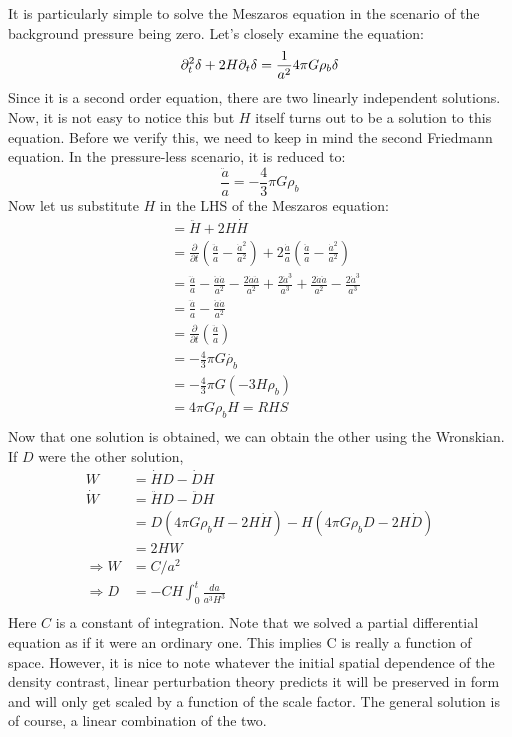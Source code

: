 \documentclass[12pt,a4paper,twoside]{book}
\def\pa{{\partial}}
\begin{document}
				It is particularly simple to solve the Meszaros equation in the scenario of the background pressure being zero. Let's closely examine the equation:
				$$
					\pa_t^2\delta+2H\pa_t\delta=\frac{1}{a^2}4\pi G\rho_b\delta\\
				$$
				Since it is a second order equation, there are two linearly independent solutions. Now, it is not easy to notice this but $H$ itself turns out to be a solution to this equation. Before we verify this, we need to keep in mind the second Friedmann equation. In the pressure-less scenario, it is reduced to:
				$$
					\frac{\ddot{a}}{a}=-\frac{4}{3}\pi G\rho_b
				$$
				Now let us substitute $H$ in the LHS of the Meszaros equation:
				$$
				\begin{aligned}
					&=\ddot{H}+2H\dot{H}\\
					&=\frac{\pa}{\pa t}\left(\frac{\ddot{a}}{a}-\frac{\dot{a}^2}{a^2}\right)+2\frac{\dot{a}}{a}\left(\frac{\ddot{a}}{a}-\frac{\dot{a}^2}{a^2}\right)\\
					&=\frac{\dddot{a}}{a}-\frac{\ddot{a}\dot{a}}{a^2}-\frac{2\dot{a}\ddot{a}}{a^2}+\frac{2\dot{a}^3}{a^3}+\frac{2\dot{a}\ddot{a}}{a^2}-\frac{2\dot{a}^3}{a^3}\\
					&=\frac{\dddot{a}}{a}-\frac{\ddot{a}\dot{a}}{a^2}\\
					&=\frac{\pa }{\pa t}\left(\frac{\ddot{a}}{a}\right)\\
					&=-\frac{4}{3}\pi G\dot{\rho_b}\\
					&=-\frac{4}{3}\pi G(-3H\rho_b)\\
					&=4\pi G \rho_b H=RHS\\
				\end{aligned}
				$$
				Now that one solution is obtained, we can obtain the other using the Wronskian. If $D$ were the other solution,
				\begin{equation}
					\begin{aligned}
						W&=\dot{H}D-\dot{D}H\\
						\dot{W}&=\ddot{H}D-\ddot{D}H\\
						&=D(4\pi G\rho_bH-2H\dot{H})-H(4\pi G\rho_bD-2H\dot{D})\\
						&=2HW\\
						\Rightarrow W&=C/a^2\\
						\Rightarrow D&=-CH\int_{0}^{t}\frac{da}{a^3H^3}\\
					\end{aligned}
					\label{eq:growth-linear}
				\end{equation}
				Here $C$ is a constant of integration. Note that we solved a partial differential equation as if it were an ordinary one. This implies C is really a function of space. However, it is nice to note whatever the initial spatial dependence of the density contrast, linear perturbation theory predicts it will be preserved in form and will only get scaled by a function of the scale factor. The general solution is of course, a linear combination of the two. 
\end{document}
